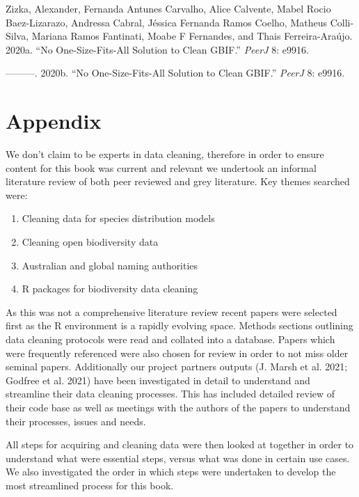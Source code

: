 \documentclass[
  letterpaper,
  DIV=11,
  numbers=noendperiod,
  oneside]{scrreprt}
\newlength{\cslhangindent}
\newlength{\cslentryspacingunit} %
\newenvironment{CSLReferences}[2] %
 {%
  \setlength{\parindent}{0pt}
  \ifodd #1
  \let\oldpar\par
  \def\par{\hangindent=\cslhangindent\oldpar}
  \fi
  \setlength{\parskip}{#2\cslentryspacingunit}
 }%
 {}
\begin{document}
\begin{CSLReferences}{1}{0}
\leavevmode{}%
Zizka, Alexander, Fernanda Antunes Carvalho, Alice Calvente, Mabel Rocio
Baez-Lizarazo, Andressa Cabral, Jéssica Fernanda Ramos Coelho, Matheus
Colli-Silva, Mariana Ramos Fantinati, Moabe F Fernandes, and Thais
Ferreira-Araújo. 2020a. {``No One-Size-Fits-All Solution to Clean
{GBIF}.''} \emph{PeerJ} 8: e9916.

\leavevmode{}%
---------. 2020b. {``No One-Size-Fits-All Solution to Clean GBIF.''}
\emph{PeerJ} 8: e9916.

\end{CSLReferences}


\hypertarget{sec-appendix}{%
\chapter{Appendix}\label{sec-appendix}}

We don't claim to be experts in data cleaning, therefore in order to
ensure content for this book was current and relevant we undertook an
informal literature review of both peer reviewed and grey literature.
Key themes searched were:

\begin{enumerate}
\def\labelenumi{\arabic{enumi}.}
\item
  Cleaning data for species distribution models
\item
  Cleaning open biodiversity data
\item
  Australian and global naming authorities
\item
  R packages for biodiversity data cleaning
\end{enumerate}

As this was not a comprehensive literature review recent papers were
selected first as the R environment is a rapidly evolving space. Methods
sections outlining data cleaning protocols were read and collated into a
database. Papers which were frequently referenced were also chosen for
review in order to not miss older seminal papers. Additionally our
project partners outputs (J. Marsh et al. 2021; Godfree et al. 2021)
have been investigated in detail to understand and streamline their data
cleaning processes. This has included detailed review of their code base
as well as meetings with the authors of the papers to understand their
processes, issues and needs.

All steps for acquiring and cleaning data were then looked at together
in order to understand what were essential steps, versus what was done
in certain use cases. We also investigated the order in which steps were
undertaken to develop the most streamlined process for this book.
\end{document}
